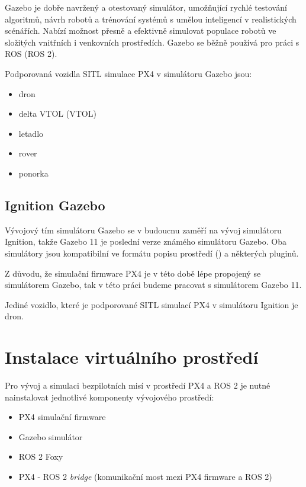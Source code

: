 Gazebo je dobře navržený a otestovaný simulátor, umožňující rychlé testování algoritmů, návrh robotů a trénování systémů s umělou inteligencí v realistických scénářích. Nabízí možnost přesně a efektivně simulovat populace robotů ve složitých vnitřních i venkovních prostředích. Gazebo se běžně používá pro práci s ROS (ROS 2). \cite{GAZ}

Podporovaná vozidla \acs{SITL} simulace PX4 v simulátoru Gazebo jsou:

\begin{itemize}
    \item dron
    \item delta \acs{VTOL} (\acl{VTOL})
    \item letadlo
    \item rover
    \item ponorka
\end{itemize}

\subsection{Ignition Gazebo}

Vývojový tím simulátoru Gazebo se v budoucnu zaměří na vývoj simulátoru Ignition, takže Gazebo 11 je poslední verze známého simulátoru Gazebo. Oba simulátory jsou kompatibilní ve formátu popisu prostředí () a některých pluginů. \cite{IGN}

Z důvodu, že simulační firmware PX4 je v této době lépe propojený se simulátorem Gazebo, tak v této práci budeme pracovat s simulátorem Gazebo 11.

Jediné vozidlo, které je podporované \acs{SITL} simulací PX4 v simulátoru Ignition je dron.

\section{Instalace virtuálního prostředí}

Pro vývoj a simulaci bezpilotních misí v prostředí PX4 a ROS 2 je nutné nainstalovat jednotlivé komponenty vývojového prostředí:

\begin{itemize}
    \item PX4 simulační firmware
    \item Gazebo simulátor
    \item ROS 2 Foxy
    \item PX4 - ROS 2 \textit{bridge} (komunikační most mezi PX4 firmware a ROS 2)\\
\end{itemize}

